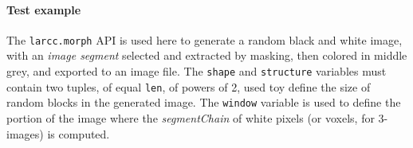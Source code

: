 \documentclass[11pt,oneside]{article}	%
\begin{document}
\paragraph{Test example}

The \texttt{larcc.morph} API is used here to generate a random black and white image, with an \emph{image segment} selected and extracted by masking, then colored in middle grey, and exported to an image file.  
The \texttt{shape} and \texttt{structure} variables must contain two tuples, of equal \texttt{len}, of powers of 2, used toy define the size of random blocks in the generated image. The \texttt{window} variable is used to define the portion of the image where the \emph{segmentChain} of white pixels (or voxels, for 3-images) is computed.

\end{document}
